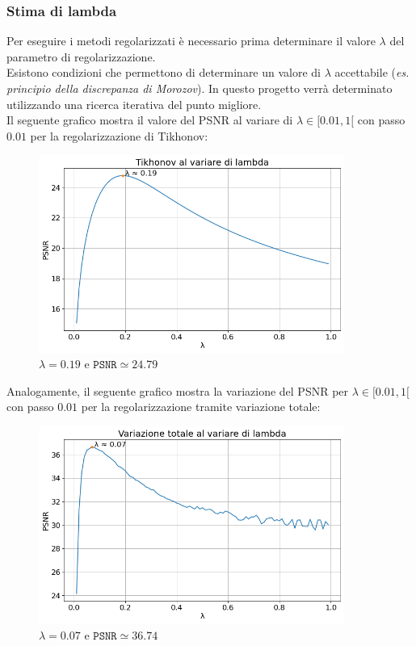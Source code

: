 \documentclass[11pt]{article}
\begin{document}
\subsubsection{Stima di lambda}
Per eseguire i metodi regolarizzati è necessario prima determinare il valore $\lambda$ del parametro di regolarizzazione.\\
Esistono condizioni che permettono di determinare un valore di $\lambda$ accettabile (\textit{es. principio della discrepanza di Morozov}). In questo progetto verrà determinato utilizzando una ricerca iterativa del punto migliore.\\
Il seguente grafico mostra il valore del PSNR al variare di $\lambda \in [0.01, 1[$ con passo $0.01$ per la regolarizzazione di Tikhonov:
\begin{figure}[H]
    \centering
    \includegraphics[width=10cm]{esecuzione/1/tikhonov_lambda.png}
    \caption{$\lambda=0.19$ e $\texttt{PSNR} \simeq 24.79$}
    \label{fig:tikhonov_lambda1}
\end{figure}
Analogamente, il seguente grafico mostra la variazione del PSNR per $\lambda \in [0.01, 1[$ con passo $0.01$ per la regolarizzazione tramite variazione totale:
\begin{figure}[H]
    \centering
    \includegraphics[width=10cm]{esecuzione/1/tv_lambda.png}
    \caption{$\lambda=0.07$ e $\texttt{PSNR} \simeq 36.74$}
    \label{fig:tv_lambda1}
\end{figure}
\end{document}
